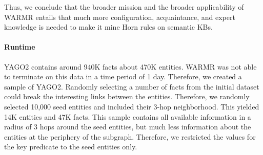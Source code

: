 Thus, we conclude that the broader mission and the broader applicability of WARMR entails that much more configuration, acquaintance, and expert knowledge is needed to make it mine Horn rules on semantic KBs.

\paragraph{Runtime} 
YAGO2\cite{yago2} contains around 940K facts about 470K entities. 
WARMR was not able to terminate on this data in a time period of 1 day. Therefore, we created a sample of YAGO2. 
Randomly selecting a number of facts from the initial dataset could break the interesting links between the entities. 
Therefore, we randomly selected 10,000 seed entities and included their 3-hop neighborhood. 
This yielded 14K entities and 47K facts. 
This sample contains all available information in a radius of 3 hops around the seed entities, but much less information about the entities at the periphery of the subgraph. 
Therefore, we restricted the values for the key predicate
to the seed entities only. 

